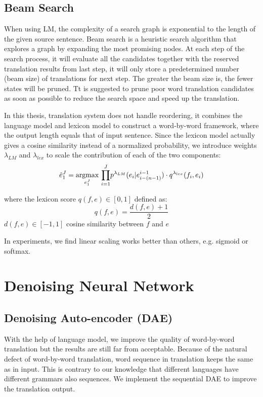	\subsection{Beam Search}
	When using LM, the complexity of a search graph is exponential to the length of the given source sentence. Beam search is a heuristic search algorithm that explores a graph by expanding the most promising nodes. At each step of the search process, it will evaluate all the candidates together with the reserved translation results from last step, it will only store a predetermined number (beam size) of translations for next step. The greater the beam size is, the fewer states will be pruned. 	
	Tt is suggested to prune poor word translation candidates as soon as possible to reduce the search space and speed up the translation. 
	
	In this thesis, translation system does not handle reordering, it combines the language model and lexicon model to construct a word-by-word framework, where the output length equals that of input sentence. Since the lexicon model actually gives a cosine similarity instead of a normalized probability, we introduce weights $\lambda_{LM}$ and $\lambda_{lex}$ to scale the contribution of each of the two components:
	\[ \hat{e}_1^J = \underset{e_1^J}{\operatorname{argmax}}{\ \prod_{i=1}^{J}} {p^{\lambda_{LM}}(e_i|e_{i-(n-1)}^{i-1}) \cdot q^{\lambda_{lex}}(f_i,e_i)}\]

 	where the lexicon score ${q(f,e) \in [0,1]}$ defined as:
 	\[q(f,e) = \frac{d(f,e)+1}{2} \]
 	${d(f,e)\in [-1,1]}$ cosine similarity between ${f}$ and ${e}$
	
	
	In experiments, we find linear scaling works better than others, e.g. sigmoid or softmax.
	
\section{Denoising Neural Network}
\subsection{Denoising Auto-encoder (DAE)}
	With the help of language model, we improve the quality of word-by-word translation but the results are still far from acceptable. Because of the natural defect of word-by-word translation, word sequence in translation keeps the same as in input. This is contrary to our knowledge that different languages have different grammars also sequences. We implement the sequential DAE to improve the translation output.
	
